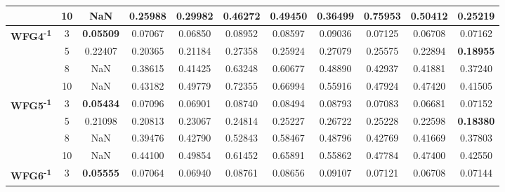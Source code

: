 \documentclass[conference]{IEEEtran}
\begin{document}
\begin{table*}[!htb]
\begin{tabular}{|c|c|c|c|c|c|c|c|c|c|c|}
		& 10         & NaN              & 0.25988           & 0.29982               & 0.46272          & 0.49450             & 0.36499             & 0.75953            & 0.50412              & 0.25219          \\ \hline
		\multirow{4}{*}{\textbf{WFG4\textsuperscript{-1}}}  & 3          & \textbf{0.05509} & 0.07067           & 0.06850               & 0.08952          & 0.08597             & 0.09036             & 0.07125            & 0.06708              & 0.07162          \\ \cline{2-11} 
		& 5          & 0.22407          & 0.20365           & 0.21184               & 0.27358          & 0.25924             & 0.27079             & 0.25575            & 0.22894              & \textbf{0.18955} \\ \cline{2-11} 
		& 8          & NaN              & 0.38615           & 0.41425               & 0.63248          & 0.60677             & 0.48890             & 0.42937            & 0.41881              & 0.37240          \\ \cline{2-11} 
		& 10         & NaN              & 0.43182           & 0.49779               & 0.72355          & 0.66994             & 0.55916             & 0.47924            & 0.47420              & 0.41505          \\ \hline
		\multirow{4}{*}{\textbf{WFG5\textsuperscript{-1}}}  & 3          & \textbf{0.05434} & 0.07096           & 0.06901               & 0.08740          & 0.08494             & 0.08793             & 0.07083            & 0.06681              & 0.07152          \\ \cline{2-11} 
		& 5          & 0.21098          & 0.20813           & 0.23067               & 0.24814          & 0.25227             & 0.26722             & 0.25228            & 0.22598              & \textbf{0.18380} \\ \cline{2-11} 
		& 8          & NaN              & 0.39476           & 0.42790               & 0.52843          & 0.58467             & 0.48796             & 0.42769            & 0.41669              & 0.37803          \\ \cline{2-11} 
		& 10         & NaN              & 0.44100           & 0.49854               & 0.61452          & 0.65891             & 0.55862             & 0.47784            & 0.47400              & 0.42550          \\ \hline
		\multirow{4}{*}{\textbf{WFG6\textsuperscript{-1}}}  & 3          & \textbf{0.05555} & 0.07064           & 0.06940               & 0.08761          & 0.08656             & 0.09107             & 0.07121            & 0.06708              & 0.07144          \\ \cline{2-11} 

\end{tabular}
\end{table*}
\end{document}
